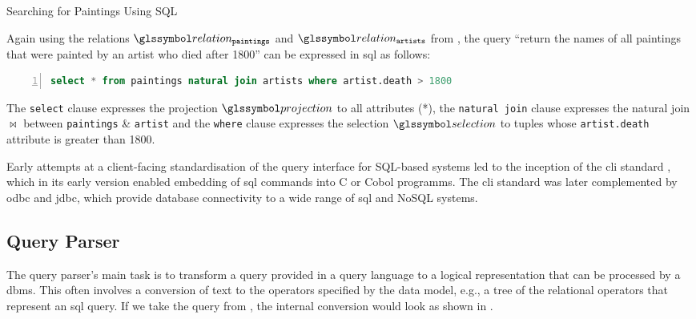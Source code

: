 \begin{example}[label=example:sql_query]{Searching for Paintings Using SQL}{}

    Again using the relations $\relation_{\mathtt{paintings}}$ and $\relation_{\mathtt{artists}}$ from , the query ``return the names of all paintings that were painted by an artist who died after 1800'' can be expressed in \acrshort{sql} as follows:

    \begin{lstlisting}[language=SQL, showspaces=false, basicstyle=\ttfamily, numbers=left, numberstyle=\tiny]
        select * from paintings natural join artists where artist.death > 1800
    \end{lstlisting}

    The \texttt{select} clause expresses the projection $\projection$ to all attributes (*), the \texttt{natural join} clause expresses the natural join $\Join$ between \texttt{paintings} \& \texttt{artist} and the \texttt{where} clause expresses the selection $\selection$ to tuples whose \texttt{artist.death} attribute is greater than 1800.
\end{example}

Early attempts at a client-facing standardisation of the query interface for SQL-based systems led to the inception of the \acrfull{cli} standard \cite{XOpen:1995CLI}, which in its early version enabled embedding of \acrshort{sql} commands into C or Cobol programms. The \acrshort{cli} standard was later complemented by \acrfull{odbc} and \acrfull{jdbc}, which provide database connectivity to a wide range of \acrshort{sql} and NoSQL systems.


\subsection{Query Parser}

The query parser's main task is to transform a query provided in a query language to a logical representation that can be processed by a \acrshort{dbms}. This often involves a conversion of text to the operators specified by the data model, e.g., a tree of the relational operators that represent an \acrshort{sql} query. If we take the query from , the internal conversion would look as shown in .

